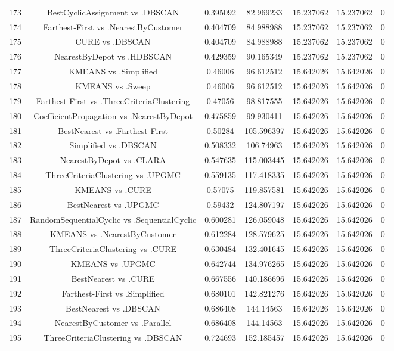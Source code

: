\documentclass[a4paper,10pt]{article}
\begin{document}
\begin{landscape}
\begin{table}[!htp]
\begin{tabular}{ccccccc}
173&BestCyclicAssignment vs .DBSCAN&0.395092&82.969233&15.237062&15.237062&0\\
174&Farthest-First vs .NearestByCustomer&0.404709&84.988988&15.237062&15.237062&0\\
175&CURE vs .DBSCAN&0.404709&84.988988&15.237062&15.237062&0\\
176&NearestByDepot vs .HDBSCAN&0.429359&90.165349&15.237062&15.237062&0\\
177&KMEANS vs .Simplified&0.46006&96.612512&15.642026&15.642026&0\\
178&KMEANS vs .Sweep&0.46006&96.612512&15.642026&15.642026&0\\
179&Farthest-First vs .ThreeCriteriaClustering&0.47056&98.817555&15.642026&15.642026&0\\
180&CoefficientPropagation vs .NearestByDepot&0.475859&99.930411&15.642026&15.642026&0\\
181&BestNearest vs .Farthest-First&0.50284&105.596397&15.642026&15.642026&0\\
182&Simplified vs .DBSCAN&0.508332&106.74963&15.642026&15.642026&0\\
183&NearestByDepot vs .CLARA&0.547635&115.003445&15.642026&15.642026&0\\
184&ThreeCriteriaClustering vs .UPGMC&0.559135&117.418335&15.642026&15.642026&0\\
185&KMEANS vs .CURE&0.57075&119.857581&15.642026&15.642026&0\\
186&BestNearest vs .UPGMC&0.59432&124.807197&15.642026&15.642026&0\\
187&RandomSequentialCyclic vs .SequentialCyclic&0.600281&126.059048&15.642026&15.642026&0\\
188&KMEANS vs .NearestByCustomer&0.612284&128.579625&15.642026&15.642026&0\\
189&ThreeCriteriaClustering vs .CURE&0.630484&132.401645&15.642026&15.642026&0\\
190&KMEANS vs .UPGMC&0.642744&134.976265&15.642026&15.642026&0\\
191&BestNearest vs .CURE&0.667556&140.186696&15.642026&15.642026&0\\
192&Farthest-First vs .Simplified&0.680101&142.821276&15.642026&15.642026&0\\
193&BestNearest vs .DBSCAN&0.686408&144.14563&15.642026&15.642026&0\\
194&NearestByCustomer vs .Parallel&0.686408&144.14563&15.642026&15.642026&0\\
195&ThreeCriteriaClustering vs .DBSCAN&0.724693&152.185457&15.642026&15.642026&0\\

\end{tabular}
\end{table}
\end{landscape}
\end{document}
